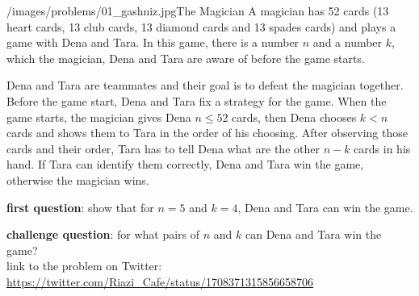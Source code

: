 \begin{problem}{/images/problems/01_gashniz.jpg}{The Magician}
    A magician has 52 cards (13 heart cards, 13 club cards, 13 diamond cards and 13 spades cards) and plays a game with Dena and Tara. In this game, there is a number $n$ and a number $k$, which the magician, Dena and Tara are aware of before the game starts.

Dena and Tara are teammates and their goal is to defeat the magician together.
Before the game start, Dena and Tara fix a strategy for the game. When the game starts, the magician gives Dena $n \leq 52$ cards, then Dena chooses $k < n$ cards and shows them to Tara in the order of his choosing. After observing those cards and their order, Tara has to tell Dena what are the other $n-k$ cards in his hand. If Tara can identify them correctly, Dena and Tara win the game, otherwise the magician wins.

\textbf{first question}: show that for $n=5$ and $k=4$, Dena and Tara can win the game.

\textbf{challenge question}: for what pairs of $n$ and $k$ can Dena and Tara win the game?\\[0.2cm]

link to the problem on Twitter:  \url{https://twitter.com/Riazi_Cafe/status/1708371315856658706}
\end{problem}
